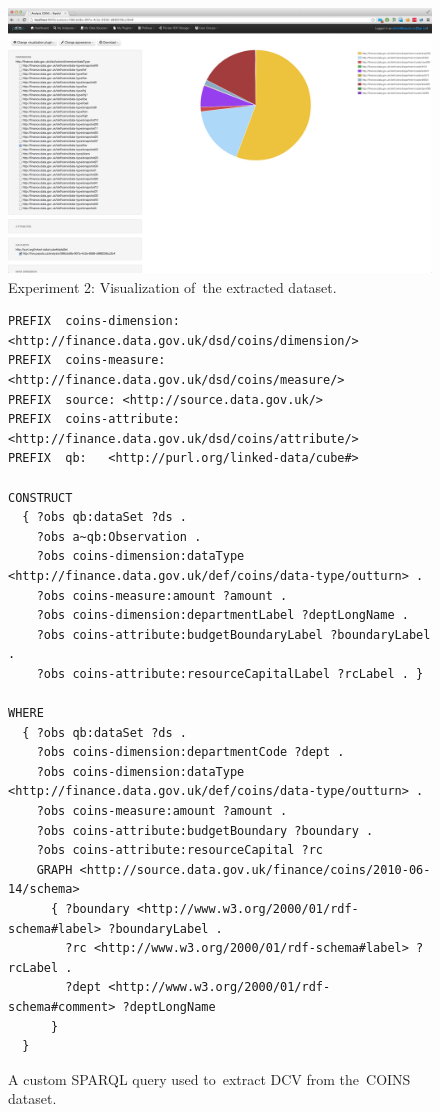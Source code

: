 \begin{figure}
  \centering
  \includegraphics[width=140mm]{img/payola-exp-02-result.png}
  \caption{Experiment 2: Visualization of~the extracted dataset.}
  \label{fig:payola-exp-02-result}
\end{figure}

\begin{figure}
  \scriptsize
\begin{verbatim}
PREFIX  coins-dimension: <http://finance.data.gov.uk/dsd/coins/dimension/>
PREFIX  coins-measure: <http://finance.data.gov.uk/dsd/coins/measure/>
PREFIX  source: <http://source.data.gov.uk/>
PREFIX  coins-attribute: <http://finance.data.gov.uk/dsd/coins/attribute/>
PREFIX  qb:   <http://purl.org/linked-data/cube#>

CONSTRUCT 
  { ?obs qb:dataSet ?ds .
    ?obs a~qb:Observation .
    ?obs coins-dimension:dataType <http://finance.data.gov.uk/def/coins/data-type/outturn> .
    ?obs coins-measure:amount ?amount .
    ?obs coins-dimension:departmentLabel ?deptLongName .
    ?obs coins-attribute:budgetBoundaryLabel ?boundaryLabel .
    ?obs coins-attribute:resourceCapitalLabel ?rcLabel . }

WHERE
  { ?obs qb:dataSet ?ds .
    ?obs coins-dimension:departmentCode ?dept .
    ?obs coins-dimension:dataType <http://finance.data.gov.uk/def/coins/data-type/outturn> .
    ?obs coins-measure:amount ?amount .
    ?obs coins-attribute:budgetBoundary ?boundary .
    ?obs coins-attribute:resourceCapital ?rc
    GRAPH <http://source.data.gov.uk/finance/coins/2010-06-14/schema>
      { ?boundary <http://www.w3.org/2000/01/rdf-schema#label> ?boundaryLabel .
        ?rc <http://www.w3.org/2000/01/rdf-schema#label> ?rcLabel .
        ?dept <http://www.w3.org/2000/01/rdf-schema#comment> ?deptLongName
      }
  }
\end{verbatim}
\caption{A custom SPARQL query used to~extract DCV from the~COINS dataset.}
\label{fig:custom-coins-query}
\end{figure}

